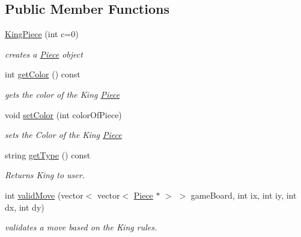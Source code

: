 \subsection*{Public Member Functions}
\begin{DoxyCompactItemize}
\item 
\hypertarget{classKingPiece_a9851298aebec5797b2497c9c3a8397f9}{
\hyperlink{classKingPiece_a9851298aebec5797b2497c9c3a8397f9}{KingPiece} (int c=0)}
\label{classKingPiece_a9851298aebec5797b2497c9c3a8397f9}

\begin{DoxyCompactList}\small\item\em creates a \hyperlink{classPiece}{Piece} object \item\end{DoxyCompactList}\item 
int \hyperlink{classKingPiece_ac15e38c6ceaccae6879ec70211c2ab28}{getColor} () const 
\begin{DoxyCompactList}\small\item\em gets the color of the King \hyperlink{classPiece}{Piece} \item\end{DoxyCompactList}\item 
void \hyperlink{classKingPiece_ab7a9023dda46c21a566675623f1b4a32}{setColor} (int colorOfPiece)
\begin{DoxyCompactList}\small\item\em sets the Color of the King \hyperlink{classPiece}{Piece} \item\end{DoxyCompactList}\item 
string \hyperlink{classKingPiece_ac93de53a7adee6e5ad33284f0fd6aa2e}{getType} () const 
\begin{DoxyCompactList}\small\item\em Returns King to user. \item\end{DoxyCompactList}\item 
int \hyperlink{classKingPiece_ae2ae8557d6d6e5fd1dcacdf7839de49f}{validMove} (vector$<$ vector$<$ \hyperlink{classPiece}{Piece} $\ast$ $>$ $>$ gameBoard, int ix, int iy, int dx, int dy)
\begin{DoxyCompactList}\small\item\em validates a move based on the King rules. \item\end{DoxyCompactList}\end{DoxyCompactItemize}


